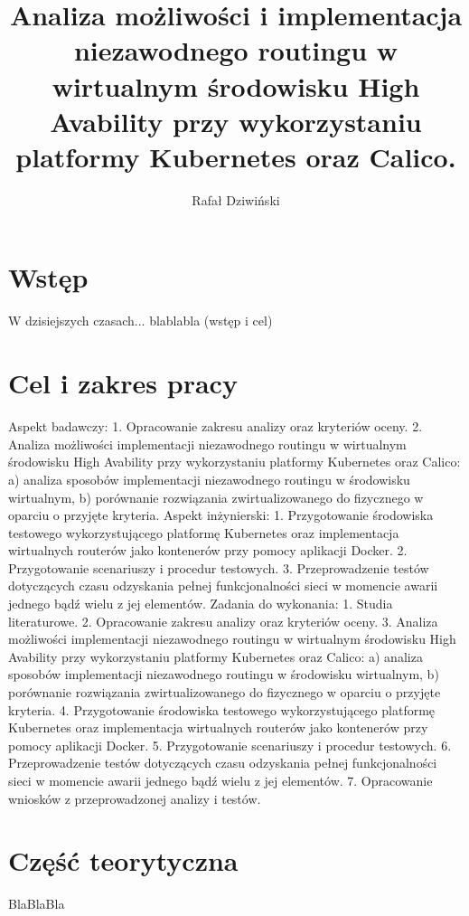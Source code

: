 \documentclass[pl,final,oneside]{mgr} %
\author{Rafał Dziwiński}
\title{Analiza możliwości i implementacja niezawodnego routingu w wirtualnym środowisku High Avability przy wykorzystaniu platformy Kubernetes oraz Calico.}
\begin{document}
\maketitle
\tableofcontents

\chapter{Wstęp}
W dzisiejszych czasach... blablabla (wstęp i cel)
\chapter{Cel i zakres pracy}
Aspekt badawczy:
1. Opracowanie zakresu analizy oraz kryteriów oceny.
2. Analiza możliwości implementacji niezawodnego routingu w wirtualnym środowisku High Avability przy
wykorzystaniu platformy Kubernetes oraz Calico:
a) analiza sposobów implementacji niezawodnego routingu w środowisku wirtualnym,
b) porównanie rozwiązania zwirtualizowanego do fizycznego w oparciu o przyjęte kryteria.
Aspekt inżynierski:
1. Przygotowanie środowiska testowego wykorzystującego platformę Kubernetes oraz implementacja wirtualnych
routerów jako kontenerów przy pomocy aplikacji Docker.
2. Przygotowanie scenariuszy i procedur testowych.
3. Przeprowadzenie testów dotyczących czasu odzyskania pełnej funkcjonalności sieci w momencie awarii jednego
bądź wielu z jej elementów.
Zadania do wykonania:
1. Studia literaturowe.
2. Opracowanie zakresu analizy oraz kryteriów oceny.
3. Analiza możliwości implementacji niezawodnego routingu w wirtualnym środowisku High Avability przy
wykorzystaniu platformy Kubernetes oraz Calico:
a) analiza sposobów implementacji niezawodnego routingu w środowisku wirtualnym,
b) porównanie rozwiązania zwirtualizowanego do fizycznego w oparciu o przyjęte kryteria.
4. Przygotowanie środowiska testowego wykorzystującego platformę Kubernetes oraz implementacja wirtualnych
routerów jako kontenerów przy pomocy aplikacji Docker.
5. Przygotowanie scenariuszy i procedur testowych.
6. Przeprowadzenie testów dotyczących czasu odzyskania pełnej funkcjonalności sieci w momencie awarii jednego
bądź wielu z jej elementów.
7. Opracowanie wniosków z przeprowadzonej analizy i testów.
\chapter{Część teorytyczna}
BlaBlaBla
\end{document}
